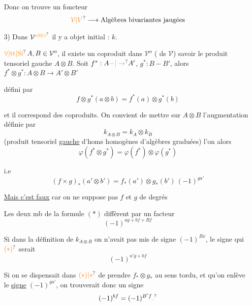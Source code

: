 Donc on trouve un foncteur 
\[
\unsure{\mathcal V|V} \longrightarrow \text{Algèbres bivariantes jaugées}
\]

3) Dans $\mathcal V^{\unsure{o|0|\circ}}$  il y a objet initial : $k$.

$\unsure{\forall|\mathrm{tt}|\text{Si}}\, A,B\in\mathcal V^{o}$, il existe un coproduit dans $\mathcal V^{o}$ ( ds $\mathcal V$) savoir le produit tensoriel gauche $A\otimes B$. Soit  $f^*:A\unsure{-|\to}A'$, $g^*:B-B'$, alors $f^*\otimes g^*:A\otimes B\to A'\otimes B'$

défini par
\[
f\otimes g^*(a\otimes b)=f^*(a)\otimes g^*(b)
\]

et il  correspond des coproduits.  On convient de mettre sur $A\otimes B$ l'augmentation définie par
\[
k_{A\otimes B}=k_A\otimes k_B
\]
(produit tensoriel \uline{gauche} d'homs homogènes d'algèbres graduées)
 l'on  alors 
\[
\varphi(f^*\otimes g^*)=\varphi(f^*)\otimes\varphi(g^*)
\]

i.e
\[
(f\times g)_*(a'\otimes b')=f_*(a')\otimes g_*(b')\,(-1)^{ga'} \tag*{$(\ast)$}
\]

\uline{Mais c'est faux}  car on ne suppose pas $f$ et $g$ de degrés 

Les deux mb de la formule $(\ast)$ diffèrent par un facteur
\[
(-1)^{ag+bf+Bf}
\]

Si dans la définition de $k_{A\otimes B}$ on n'avait pas mis de signe $(-1)^{Bx}$, le signe qui   $\unsure{(\ast)}$ serait
\[
(-1)^{a'g+bf}
\]

Si  on se dispensait dans $\unsure{(\ast)|\ast}$ de prendre $f_*\otimes g_*$ au sens  tordu, et qu'on  enlève le \uline{signe} $(-1)^{ga'}$, on trouverait donc un signe
\[
(-1)^{bf}=(-1)^{B'f}\unsure{.}
\]

